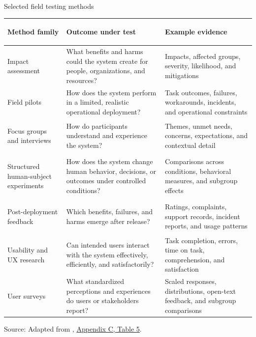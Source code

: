 \documentclass[aspectratio=169]{beamer}
\newcommand{\slidesource}[1]{\vfill\tiny\color{hrgray}Source: #1.}
\begin{document}
\begin{frame}{Selected field testing methods}
\fontsize{6.7}{7.4}\selectfont
\renewcommand{\arraystretch}{.92}
\begin{tabularx}{\textwidth}{>{\bfseries\raggedright\arraybackslash}p{}Y Y}
\toprule
Method family & Outcome under test & Example evidence \\
\midrule
Impact assessment & What benefits and harms could the system create for people, organizations, and resources? & Impacts, affected groups, severity, likelihood, and mitigations \\
Field pilots & How does the system perform in a limited, realistic operational deployment? & Task outcomes, failures, workarounds, incidents, and operational constraints \\
Focus groups and interviews & How do participants understand and experience the system? & Themes, unmet needs, concerns, expectations, and contextual detail \\
Structured human-subject experiments & How does the system change human behavior, decisions, or outcomes under controlled conditions? & Comparisons across conditions, behavioral measures, and subgroup effects \\
Post-deployment feedback & Which benefits, failures, and harms emerge after release? & Ratings, complaints, support records, incident reports, and usage patterns \\
Usability and UX research & Can intended users interact with the system effectively, efficiently, and satisfactorily? & Task completion, errors, time on task, comprehension, and satisfaction \\
User surveys & What standardized perceptions and experiences do users or stakeholders report? & Scaled responses, distributions, open-text feedback, and subgroup comparisons \\
\bottomrule
\end{tabularx}
\slidesource{Adapted from \parencite{Phillips2026TEVVAthlon}, \href{https://doi.org/10.6028/NIST.AI.200-2.ipd}{Appendix C, Table 5}}
\end{frame}
\end{document}

